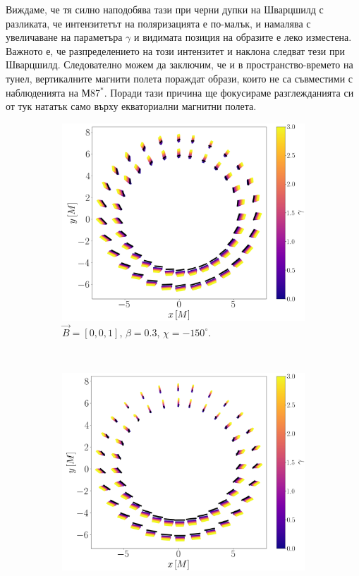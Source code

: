 Виждаме, че тя силно наподобява тази при черни дупки на Шварцшилд с разликата, че интензитетът на поляризацията е по-малък, и намалява с увеличаване на параметъра $\gamma$ и видимата позиция на образите е леко изместена. Важното е, че разпределението на този интензитет и наклона следват тези при Шварцшилд. Следователно можем да заключим, че и в пространство-времето на тунел, вертикалните магнити полета пораждат образи, които не са съвместими с наблюденията на М87$^*$. Поради тази причина ще фокусираме разглежданията си от тук нататък само върху екваториални магнитни полета. \newpage

\begin{figure}[!htb]
	\begin{subfigure}{6cm}
		\includegraphics[scale = 0.2]{WH_alpha_Vert_Field.png}
		\caption{$\vec{B} = [0, 0, 1]$, $\beta = 0.3$, $\chi = -150^\circ$.} 
	\end{subfigure}\,\,\,
	\begin{subfigure}{6cm}
		\includegraphics[scale = 0.2]{WH_alpha_Vert_Field_beta_zero.png}

\end{subfigure}
\end{figure}
